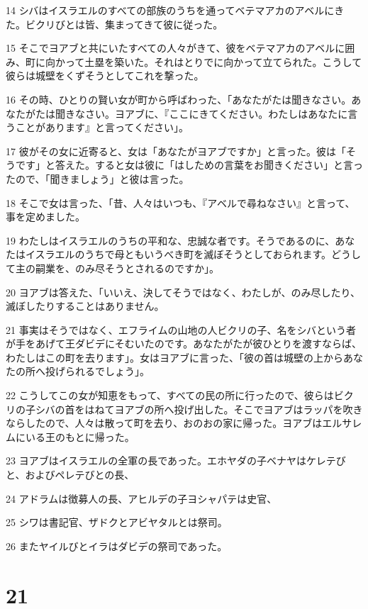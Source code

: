 \par 14 シバはイスラエルのすべての部族のうちを通ってベテマアカのアベルにきた。ビクリびとは皆、集まってきて彼に従った。
\par 15 そこでヨアブと共にいたすべての人々がきて、彼をベテマアカのアベルに囲み、町に向かって土塁を築いた。それはとりでに向かって立てられた。こうして彼らは城壁をくずそうとしてこれを撃った。
\par 16 その時、ひとりの賢い女が町から呼ばわった、「あなたがたは聞きなさい。あなたがたは聞きなさい。ヨアブに、『ここにきてください。わたしはあなたに言うことがあります』と言ってください」。
\par 17 彼がその女に近寄ると、女は「あなたがヨアブですか」と言った。彼は「そうです」と答えた。すると女は彼に「はしための言葉をお聞きください」と言ったので、「聞きましょう」と彼は言った。
\par 18 そこで女は言った、「昔、人々はいつも、『アベルで尋ねなさい』と言って、事を定めました。
\par 19 わたしはイスラエルのうちの平和な、忠誠な者です。そうであるのに、あなたはイスラエルのうちで母ともいうべき町を滅ぼそうとしておられます。どうして主の嗣業を、のみ尽そうとされるのですか」。
\par 20 ヨアブは答えた、「いいえ、決してそうではなく、わたしが、のみ尽したり、滅ぼしたりすることはありません。
\par 21 事実はそうではなく、エフライムの山地の人ビクリの子、名をシバという者が手をあげて王ダビデにそむいたのです。あなたがたが彼ひとりを渡すならば、わたしはこの町を去ります」。女はヨアブに言った、「彼の首は城壁の上からあなたの所へ投げられるでしょう」。
\par 22 こうしてこの女が知恵をもって、すべての民の所に行ったので、彼らはビクリの子シバの首をはねてヨアブの所へ投げ出した。そこでヨアブはラッパを吹きならしたので、人々は散って町を去り、おのおの家に帰った。ヨアブはエルサレムにいる王のもとに帰った。
\par 23 ヨアブはイスラエルの全軍の長であった。エホヤダの子ベナヤはケレテびと、およびペレテびとの長、
\par 24 アドラムは徴募人の長、アヒルデの子ヨシャパテは史官、
\par 25 シワは書記官、ザドクとアビヤタルとは祭司。
\par 26 またヤイルびとイラはダビデの祭司であった。

\chapter{21}

